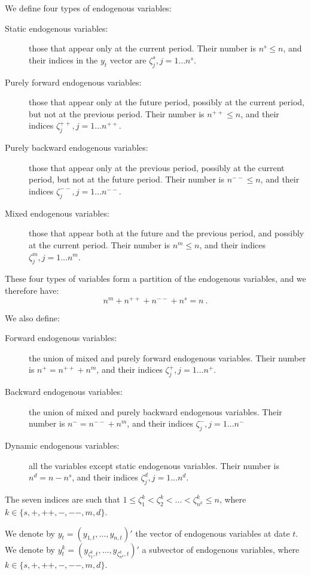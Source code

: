 \documentclass[11pt,a4paper]{article}
\begin{document}
We define four types of endogenous variables:
\begin{description}
\item[Static endogenous variables:] those that appear only at the current
  period. Their number is $n^s \leq n$, and their indices in the $y_t$ vector
  are $\zeta^s_j, j=1\ldots n^s$.
\item[Purely forward endogenous variables:] those that appear only at the
  future period, possibly at the current period, but not at the previous
  period. Their number is $n^{++} \leq n$, and their indices $\zeta^{++}_j,
  j=1\ldots n^{++}$.
\item[Purely backward endogenous variables:] those that appear only at the
  previous period, possibly at the current period, but not at the future
  period.  Their number is $n^{--} \leq n$, and their indices $\zeta^{--}_j,
  j=1\ldots n^{--}$.
\item[Mixed endogenous variables:] those that appear both at the future and the
  previous period, and possibly at the current period.  Their number is $n^m
  \leq n$, and their indices $\zeta^m_j, j=1\ldots n^m$.
\end{description}

These four types of variables form a partition of the endogenous variables, and
we therefore have:
\begin{equation*}
  n^m + n^{++} + n^{--} + n^s = n \: .
\end{equation*}

We also define:
\begin{description}
\item[Forward endogenous variables:] the union of mixed and purely forward
  endogenous variables. Their number is $n^+ = n^{++} + n^m$, and their indices
  $\zeta^+_j, j=1\ldots n^+$.
\item[Backward endogenous variables:] the union of mixed and purely backward
  endogenous variables. Their number is $n^- = n^{--} + n^m$, and their indices
  $\zeta^-_j, j=1\ldots n^-$
\item[Dynamic endogenous variables:] all the variables except static endogenous
  variables. Their number is $n^d = n - n^s$, and their indices $\zeta^d_j,
  j=1\ldots n^d$.
\end{description}

The seven indices are such that $1 \leq \zeta^k_1 < \zeta^k_2 < \ldots <
\zeta^k_{n^k} \leq n$, where $k \in \{ s, +, ++, -, --, m, d \}$.

We denote by $y_t = (y_{1,t}, \ldots, y_{n,t})'$ the vector of endogenous
variables at date $t$. We denote by $y^k_t = (y_{\zeta^k_1, t}, \ldots,
y_{\zeta^k_{n^k}, t})'$ a subvector of endogenous variables, where $k \in \{
s, +, ++, -, --, m, d \}$.
\end{document}
